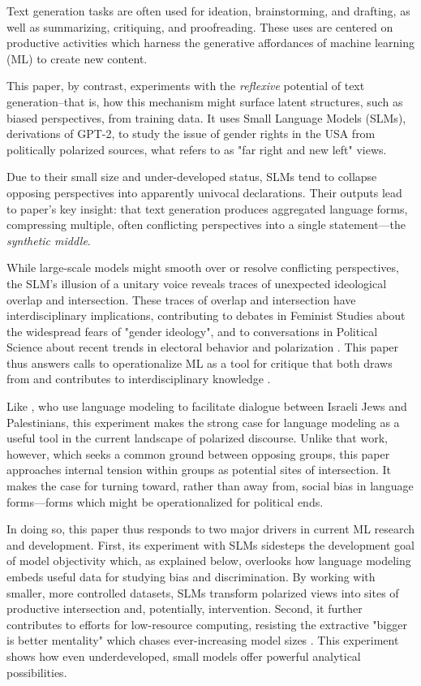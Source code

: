 \documentclass[anonymous,review]{acmart}
\begin{document}
Text generation tasks are often used for ideation, brainstorming, and drafting, as well as summarizing, critiquing, and proofreading. These uses are centered on productive activities which harness the generative affordances of machine learning (ML) to create new content.

This paper, by contrast, experiments with the \textit{reflexive} potential of text generation--that is, how this mechanism might surface latent structures, such as biased perspectives, from training data. It uses Small Language Models (SLMs), derivations of GPT-2, to study the issue of gender rights in the USA from politically polarized sources, what \citet{bornschier_2021} refers to as "far right and new left" views.

Due to their small size and under-developed status, SLMs tend to collapse opposing perspectives into apparently univocal declarations. Their outputs lead to paper's key insight: that text generation produces aggregated language forms, compressing multiple, often conflicting perspectives into a single statement---the \textit{synthetic middle}.

While large-scale models might smooth over or resolve conflicting perspectives, the SLM's illusion of a unitary voice reveals traces of unexpected ideological overlap and intersection. These traces of overlap and intersection have interdisciplinary implications, contributing to debates in Feminist Studies about the widespread fears of "gender ideology", and to conversations in Political Science about recent trends in electoral behavior and polarization \citep{butler_2024,bornschier_2021}. This paper thus answers calls to operationalize ML as a tool for critique that both draws from and contributes to interdisciplinary knowledge \citep{wanga_2025,birhane_2022,devinney_2022}.

Like \citet{konya_2025}, who use language modeling to facilitate dialogue between Israeli Jews and Palestinians, this experiment makes the strong case for language modeling as a useful tool in the current landscape of polarized discourse. Unlike that work, however, which seeks a common ground between opposing groups, this paper approaches internal tension within groups as potential sites of intersection. It makes the case for turning toward, rather than away from, social bias in language forms---forms which might be operationalized for political ends.

In doing so, this paper thus responds to two major drivers in current ML research and development. First, its experiment with SLMs sidesteps the development goal of model objectivity which, as explained below, overlooks how language modeling embeds useful data for studying bias and discrimination. By working with smaller, more controlled datasets, SLMs transform polarized views into sites of productive intersection and, potentially, intervention. Second, it further contributes to efforts for low-resource computing, resisting the extractive "bigger is better mentality" which chases ever-increasing model sizes \citep{varoquaux_2025}. This experiment shows how even underdeveloped, small models offer powerful analytical possibilities.
\end{document}
